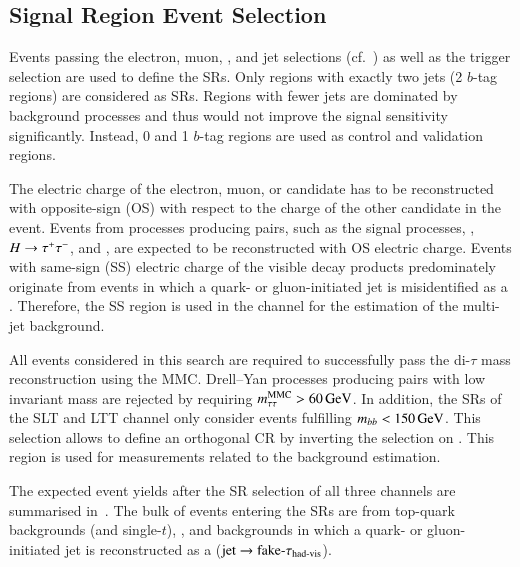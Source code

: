 


\subsection{Signal Region Event Selection}%
\label{sec:sr_and_cr_selection}

Events passing the electron, muon, \tauhadvis, and jet selections
(cf.~) as well as the trigger selection are used to
define the SRs. Only regions with exactly two \btagged jets (2 $b$-tag regions)
are considered as SRs. Regions with fewer \btagged jets are dominated by
background processes and thus would not improve the signal sensitivity
significantly. Instead, 0 and 1 $b$-tag regions are used as control and
validation regions.

The electric charge of the electron, muon, or \tauhadvis candidate has to be
reconstructed with opposite-sign (OS) with respect to the charge of the other
\tauhadvis candidate in the event. Events from processes producing \taulepton
pairs, such as the signal processes, \Zjets, $H \to \tau^{+} \tau^{-}$, and \ttbar, are
expected to be reconstructed with OS electric charge. Events with same-sign (SS)
electric charge of the visible \taulepton decay products predominately originate
from events in which a quark- or gluon-initiated jet is misidentified as a
\tauhadvis. Therefore, the SS region is used in the \hadhad channel for the
estimation of the multi-jet background.

All events considered in this search are required to successfully pass the
di-$\tau$ mass reconstruction using the MMC. Drell--Yan processes producing
\taulepton pairs with low invariant mass are rejected by requiring
$m_{\tau\tau}^\text{MMC} > \SI{60}{\ensuremath{\text{GeV}}}$. In addition, the SRs of the \lephad SLT and LTT channel
only consider events fulfilling $m_{bb} < \SI{150}{\ensuremath{\text{GeV}}}$. This selection allows
to define an orthogonal \ttbar CR by inverting the selection on \mBB. This
region is used for measurements related to the \faketauhadvis background
estimation.

The expected event yields after the SR selection of all three channels are
summarised in~. The bulk of events entering the SRs
are from top-quark backgrounds (\ttbar and single-$t$), \Zjets, and backgrounds
in which a quark- or gluon-initiated jet is reconstructed as a \tauhadvis
($\text{jet} \to \text{fake-}\tau_{\text{had-vis}}$).



